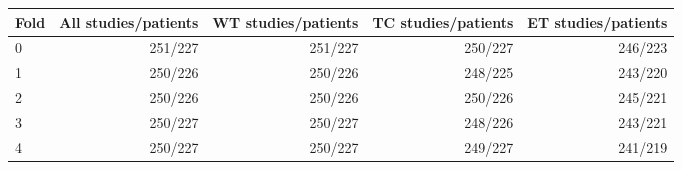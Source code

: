 \begin{tabular}{lrrrr}
\toprule
Fold & All studies/patients & WT studies/patients & TC studies/patients & ET studies/patients \\
\midrule
0 & 251/227 & 251/227 & 250/227 & 246/223 \\
1 & 250/226 & 250/226 & 248/225 & 243/220 \\
2 & 250/226 & 250/226 & 250/226 & 245/221 \\
3 & 250/227 & 250/227 & 248/226 & 243/221 \\
4 & 250/227 & 250/227 & 249/227 & 241/219 \\
\bottomrule
\end{tabular}
